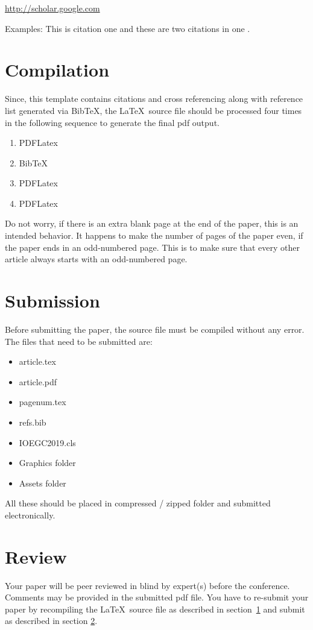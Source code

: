 \documentclass[fleqn, 11pt, twoside]{IOEGC2019}
\begin{document}
\url{http://scholar.google.com}

Examples: This is citation one\cite{lamport1994} and these are two citations in 
one \cite{oetiker2001not, kopka1995guide}.


\section{Compilation} \label{sec:compile}
Since, this template contains citations and cross referencing along with 
reference list generated via BibTeX, the \LaTeX\ source file should be processed
four times in the following sequence to generate the final pdf output.
\begin{enumerate}
	\item PDFLatex
	\item BibTeX
	\item PDFLatex
	\item PDFLatex
\end{enumerate}

Do not worry, if there is an extra blank page at the end of the paper, this is 
an intended behavior. It happens to make the number of pages of the paper even, 
if the paper ends in an odd-numbered page. This is to make sure that every other
article always starts with an odd-numbered page.


\section{Submission} \label{sec:submit}
Before submitting the paper, the source file must be compiled without any error. 
The files that need to be submitted are:
\begin{itemize}[noitemsep]
\item article.tex
\item article.pdf
\item pagenum.tex
\item refs.bib 
\item IOEGC2019.cls
\item Graphics folder 
\item Assets folder 
\end{itemize}
All these should be placed in compressed / zipped folder and submitted 
electronically.

\section{Review}
Your paper will be peer reviewed in blind by expert(s) before the conference. 
Comments may be provided in the submitted pdf file. You have to re-submit your 
paper by recompiling the \LaTeX\ source file as described in 
section~\ref{sec:compile} and submit as described in section \ref{sec:submit}.
\end{document}
